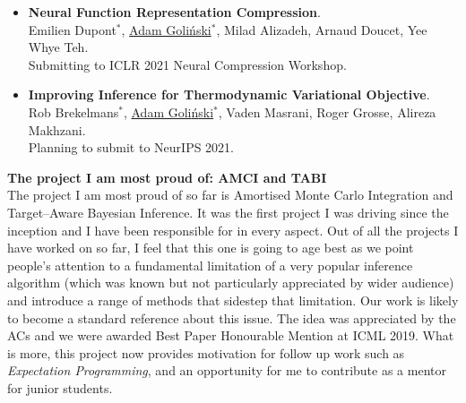 \documentclass[12pt]{article}
\begin{document}
\begin{itemize}
Anthony Caterini$^{*}$, \underline{Adam Goli{\'n}ski}$^{*}$.\\
Submitting to ICLR 2021 Neural Compression Workshop.
\item \textbf{Neural Function Representation Compression}.\\
Emilien Dupont$^{*}$, \underline{Adam Goli{\'n}ski}$^{*}$, Milad Alizadeh, Arnaud Doucet, Yee Whye Teh.\\
Submitting to ICLR 2021 Neural Compression Workshop.
\item \textbf{Improving Inference for Thermodynamic Variational Objective}. \\
Rob Brekelmans$^{*}$, \underline{Adam Goli{\'n}ski}$^{*}$, Vaden Masrani, Roger Grosse, Alireza Makhzani. \\
Planning to submit to NeurIPS 2021.
\end{itemize}


\vspace{10pt}
\textbf{The project I am most proud of: AMCI and TABI}\\
The project I am most proud of so far is Amortised Monte Carlo Integration and Target–Aware Bayesian Inference.
It was the first project I was driving since the inception and I have been responsible for in every aspect.
Out of all the projects I have worked on so far, 
I feel that this one is going to age best as
we point people's attention to a fundamental limitation of a very popular inference algorithm 
(which was known but not particularly appreciated by wider audience) 
and introduce a range of methods that sidestep that limitation.
Our work is likely to become a standard reference about this issue. 
The idea was appreciated by the ACs and we were awarded Best Paper Honourable Mention at ICML 2019.
What is more, this project now provides motivation for follow up work such as \emph{Expectation Programming},
and an opportunity for me to contribute as a mentor for junior students.
\end{document}
